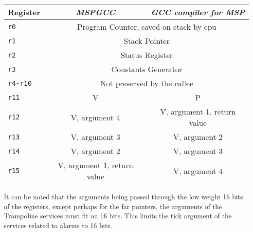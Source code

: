 \documentclass[11pt, oneside]{article}   	%
\begin{document}
\begin{center}
\begin{tabular}{|l|c|c|}
\hline
Register & \emph{MSPGCC} & \emph{GCC compiler for MSP} \\
\hline
\hline
\lstinline|r0| & \multicolumn{2}{c|}{Program Counter, saved on stack by cpu} \\
\hline
\lstinline|r1| & \multicolumn{2}{c|}{Stack Pointer} \\
\hline
\lstinline|r2| & \multicolumn{2}{c|}{Status Register} \\
\hline
\lstinline|r3| & \multicolumn{2}{c|}{Constants Generator} \\
\hline
\lstinline|r4-r10| & \multicolumn{2}{c|}{Not preserved by the callee} \\
\hline
\lstinline|r11| & V & P \\
\hline
\lstinline|r12| & V, argument 4 & V, argument 1, return value \\
\hline
\lstinline|r13| & V, argument 3 & V, argument 2 \\
\hline
\lstinline|r14| & V, argument 2 & V, argument 3 \\
\hline
\lstinline|r15| & V, argument 1, return value & V, argument 4 \\
\hline
\end{tabular}
\end{center}


It can be noted that the arguments being passed through the low weight 16 bits of the registers, except perhaps for the far pointers, the arguments of the Trampoline services must fit on 16 bits. This limits the tick argument of the services related to alarms to 16 bits. 

\end{document}
